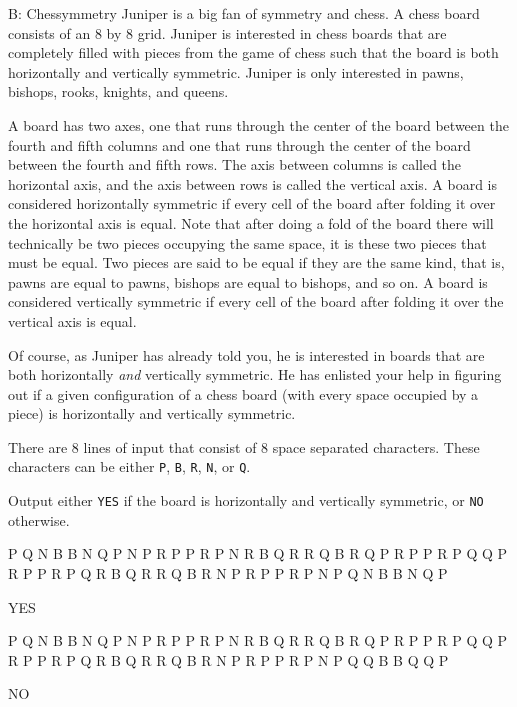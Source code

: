 \begin{problem}{B: Chessymmetry} 
Juniper is a big fan of symmetry and chess.
A chess board consists of an 8 by 8 grid.
Juniper is interested in chess boards that are completely filled with pieces from the game of chess such that the board is both horizontally and vertically symmetric.
Juniper is only interested in pawns, bishops, rooks, knights, and queens.

A board has two axes, one that runs through the center of the board between the fourth and fifth columns and one that runs through the center of the board between the fourth and fifth rows.
The axis between columns is called the horizontal axis, and the axis between rows is called the vertical axis.
A board is considered horizontally symmetric if every cell of the board after folding it over the horizontal axis is equal.
Note that after doing a fold of the board there will technically be two pieces occupying the same space, it is these two pieces that must be equal.
Two pieces are said to be equal if they are the same kind, that is, pawns are equal to pawns, bishops are equal to bishops, and so on.
A board is considered vertically symmetric if every cell of the board after folding it over the vertical axis is equal.

Of course, as Juniper has already told you, he is interested in boards that are both horizontally \textit{and} vertically symmetric.
He has enlisted your help in figuring out if a given configuration of a chess board (with every space occupied by a piece) is horizontally and vertically symmetric.
\end{problem}

\begin{formalin}
There are 8 lines of input that consist of 8 space separated characters.
These characters can be either \texttt{P}, \texttt{B}, \texttt{R}, \texttt{N}, or \texttt{Q}.
\end{formalin}

\begin{formalout}
Output either \texttt{YES} if the board is horizontally and vertically symmetric, or \texttt{NO} otherwise. 
\end{formalout}

\begin{datain}
P Q N B B N Q P
N P R P P R P N
R B Q R R Q B R
Q P R P P R P Q
Q P R P P R P Q
R B Q R R Q B R
N P R P P R P N
P Q N B B N Q P
\end{datain}
\begin{dataout}
YES
\end{dataout}

\begin{datain}
P Q N B B N Q P
N P R P P R P N
R B Q R R Q B R
Q P R P P R P Q
Q P R P P R P Q
R B Q R R Q B R
N P R P P R P N
P Q Q B B Q Q P
\end{datain}
\begin{dataout}
NO
\end{dataout}
